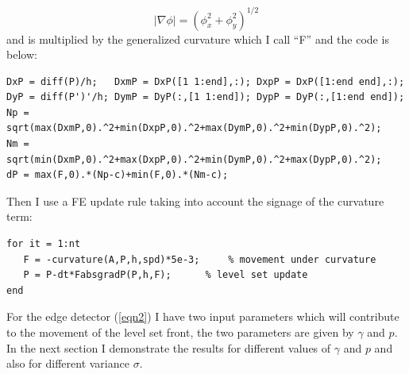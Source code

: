 \documentclass[margin=1in,12pt,3p]{elsarticle}
\begin{document}
\[
|\nabla\phi|=(\phi_x^2+\phi_y^2)^{1/2}
\]
and is multiplied by the generalized curvature which I call ``F'' and the code is below:
\begin{lstlisting}
DxP = diff(P)/h;   DxmP = DxP([1 1:end],:); DxpP = DxP([1:end end],:);
DyP = diff(P')'/h; DymP = DyP(:,[1 1:end]); DypP = DyP(:,[1:end end]);
Np = sqrt(max(DxmP,0).^2+min(DxpP,0).^2+max(DymP,0).^2+min(DypP,0).^2);
Nm = sqrt(min(DxmP,0).^2+max(DxpP,0).^2+min(DymP,0).^2+max(DypP,0).^2);
dP = max(F,0).*(Np-c)+min(F,0).*(Nm-c);
\end{lstlisting}
Then I use a FE update rule taking into account the signage of the curvature term:
\begin{lstlisting}
for it = 1:nt 
   F = -curvature(A,P,h,spd)*5e-3;     % movement under curvature
   P = P-dt*FabsgradP(P,h,F);      % level set update
end
\end{lstlisting}
For the edge detector (\ref{eqn2}) I have two input parameters which will contribute to the movement of the level set front, the two parameters are given by $\gamma$ and $p$. In the next section I demonstrate the results for different values of $\gamma$ and $p$ and also for different variance $\sigma$. 
\clearpage
\end{document}
